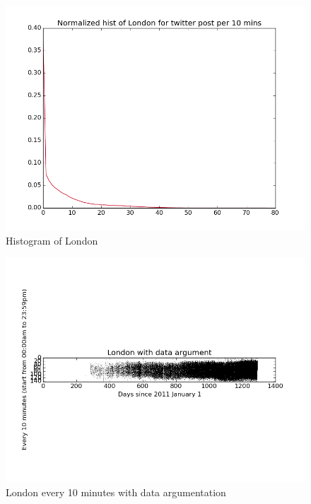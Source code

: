 \documentclass[a4paper,12pt]{article}
\begin{document}
\begin{figure}[H]
  \begin{center}
      \includegraphics[scale=0.8]{1Londonhisto.png}
\end{center}
\caption{Histogram of London}
 \label {fig:2}
 \end{figure}

\begin{figure}[H]
  \begin{center}
      \includegraphics[scale=0.8]{1Londonbinary.png}
\end{center}
\caption{London every 10 minutes with data argumentation}
 \label {fig:2}
 \end{figure}
\end{document}
